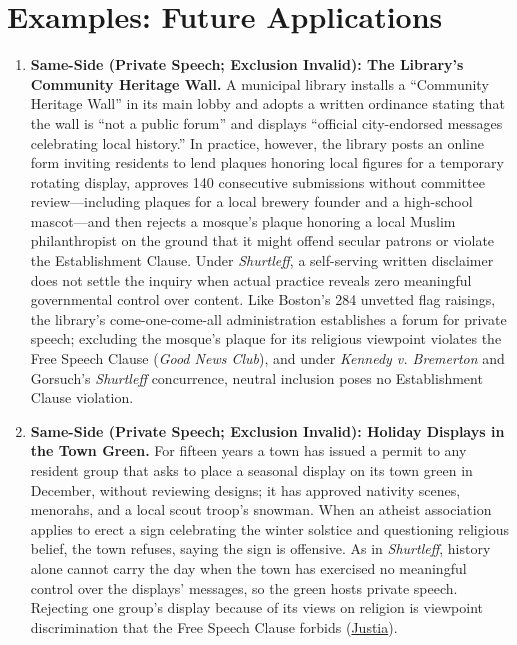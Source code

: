 \documentclass[12pt]{article}
\begin{document}
\section{Examples: Future Applications}
\begin{enumerate}

\item \textbf{Same-Side (Private Speech; Exclusion Invalid): The Library's Community Heritage Wall.} A municipal library installs a ``Community Heritage Wall'' in its main lobby and adopts a written ordinance stating that the wall is ``not a public forum'' and displays ``official city-endorsed messages celebrating local history.'' In practice, however, the library posts an online form inviting residents to lend plaques honoring local figures for a temporary rotating display, approves 140 consecutive submissions without committee review---including plaques for a local brewery founder and a high-school mascot---and then rejects a mosque's plaque honoring a local Muslim philanthropist on the ground that it might offend secular patrons or violate the Establishment Clause. Under \textit{Shurtleff}, a self-serving written disclaimer does not settle the inquiry when actual practice reveals zero meaningful governmental control over content. Like Boston's 284 unvetted flag raisings, the library's come-one-come-all administration establishes a forum for private speech; excluding the mosque's plaque for its religious viewpoint violates the Free Speech Clause (\textit{Good News Club}), and under \textit{Kennedy v. Bremerton} and Gorsuch's \textit{Shurtleff} concurrence, neutral inclusion poses no Establishment Clause violation.

\item \textbf{Same-Side (Private Speech; Exclusion Invalid): Holiday Displays in the Town Green.} For fifteen years a town has issued a permit to any resident group that asks to place a seasonal display on its town green in December, without reviewing designs; it has approved nativity scenes, menorahs, and a local scout troop's snowman. When an atheist association applies to erect a sign celebrating the winter solstice and questioning religious belief, the town refuses, saying the sign is offensive. As in \textit{Shurtleff}, history alone cannot carry the day when the town has exercised no meaningful control over the displays' messages, so the green hosts private speech. Rejecting one group's display because of its views on religion is viewpoint discrimination that the Free Speech Clause forbids (\href{https://supreme.justia.com/cases/federal/us/596/20-1800/}{Justia}).


\end{enumerate}
\end{document}
